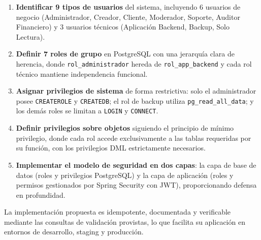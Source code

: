 \documentclass[conference, onecolumn]{IEEEtran}
\begin{document}
\begin{enumerate}[label=\arabic*)]
    \item \textbf{Identificar 9 tipos de usuarios} del sistema, incluyendo 6 usuarios de negocio (Administrador, Creador, Cliente, Moderador, Soporte, Auditor Financiero) y 3 usuarios técnicos (Aplicación Backend, Backup, Solo Lectura).

    \item \textbf{Definir 7 roles de grupo} en PostgreSQL con una jerarquía clara de herencia, donde \texttt{rol\_administrador} hereda de \texttt{rol\_app\_backend} y cada rol técnico mantiene independencia funcional.

    \item \textbf{Asignar privilegios de sistema} de forma restrictiva: solo el administrador posee \texttt{CREATEROLE} y \texttt{CREATEDB}; el rol de backup utiliza \texttt{pg\_read\_all\_data}; y los demás roles se limitan a \texttt{LOGIN} y \texttt{CONNECT}.

    \item \textbf{Definir privilegios sobre objetos} siguiendo el principio de mínimo privilegio, donde cada rol accede exclusivamente a las tablas requeridas por su función, con los privilegios DML estrictamente necesarios.

    \item \textbf{Implementar el modelo de seguridad en dos capas}: la capa de base de datos (roles y privilegios PostgreSQL) y la capa de aplicación (roles y permisos gestionados por Spring Security con JWT), proporcionando defensa en profundidad.
\end{enumerate}

La implementación propuesta es idempotente, documentada y verificable mediante las consultas de validación provistas, lo que facilita su aplicación en entornos de desarrollo, staging y producción.
\end{document}
